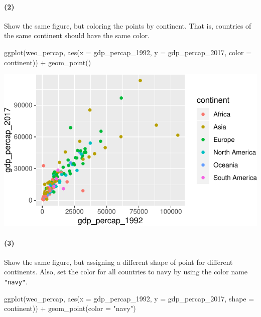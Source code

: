 \documentclass[11pt]{article}
\newenvironment{Shaded}{\begin{snugshade}}{\end{snugshade}}
\newcommand{\AttributeTok}[1]{\textcolor[rgb]{0.77,0.63,0.00}{#1}}
\newcommand{\FunctionTok}[1]{\textcolor[rgb]{0.00,0.00,0.00}{#1}}
\newcommand{\NormalTok}[1]{#1}
\newcommand{\SpecialCharTok}[1]{\textcolor[rgb]{0.00,0.00,0.00}{#1}}
\newcommand{\StringTok}[1]{\textcolor[rgb]{0.31,0.60,0.02}{#1}}
\begin{document}
\paragraph{(2)}

Show the same figure, but coloring the points by continent. That is,
countries of the same continent should have the same color.

\begin{Shaded}
\begin{Highlighting}[]
\FunctionTok{ggplot}\NormalTok{(weo\_percap,}
       \FunctionTok{aes}\NormalTok{(}\AttributeTok{x =}\NormalTok{ gdp\_percap\_1992, }\AttributeTok{y =}\NormalTok{ gdp\_percap\_2017, }\AttributeTok{color =}\NormalTok{ continent)) }\SpecialCharTok{+}
  \FunctionTok{geom\_point}\NormalTok{()}
\end{Highlighting}
\end{Shaded}

\includegraphics{pre-assignment_files/figure-latex/unnamed-chunk-8-1.pdf}

\paragraph{(3)}

Show the same figure, but assigning a different shape of point for
different continents. Also, set the color for all countries to navy by
using the color name \texttt{"navy"}.

\begin{Shaded}
\begin{Highlighting}[]
\FunctionTok{ggplot}\NormalTok{(weo\_percap,}
       \FunctionTok{aes}\NormalTok{(}\AttributeTok{x =}\NormalTok{ gdp\_percap\_1992, }\AttributeTok{y =}\NormalTok{ gdp\_percap\_2017, }\AttributeTok{shape =}\NormalTok{ continent)) }\SpecialCharTok{+}
  \FunctionTok{geom\_point}\NormalTok{(}\AttributeTok{color =} \StringTok{"navy"}\NormalTok{)}
\end{Highlighting}
\end{Shaded}
\end{document}
